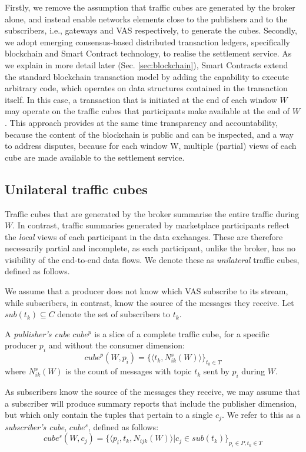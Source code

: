 \documentclass[conference]{IEEEtran}
\begin{document}
Firstly, we remove the assumption that traffic cubes are generated by the broker alone, and instead enable networks elements close to the publishers and to the subscribers, i.e., gateways and VAS respectively, to generate the cubes.
%
Secondly, we adopt emerging consensus-based distributed transaction ledgers, specifically blockchain and Smart Contract technology, to realise the settlement service.
As we explain in more detail later (Sec. \ref{sec:blockchain}), Smart Contracts extend the standard blockchain transaction model by adding the capability to execute arbitrary code, which operates on data structures contained in the transaction itself. 
In this case, a transaction that is initiated at the end of each window $W$ may operate on the traffic cubes that participants make available at the end of $W$.
This  approach provides at the same time transparency and accountability, because the content of the blockchain is public and can be inspected, and a way to address disputes, because for each window W, multiple (partial) views of each cube are made available to the settlement service.

\subsection{Unilateral traffic cubes} \label{sec:u-cubes}

Traffic cubes that are generated by the broker summarise the entire traffic during $W$.
In contrast, traffic summaries generated by marketplace participants reflect the \textit{local} views of each participant in the data exchanges.
These are therefore necessarily partial and incomplete, as each participant, unlike the broker, has no visibility of the end-to-end data flows. 
We denote these as \textit{unilateral} traffic cubes, defined as follows.

We assume that a producer does not know which VAS subscribe to its stream, while subscribers, in contrast, know the source of the messages they receive. 
Let $\mathit{sub}(t_k) \subseteq C $ denote the set of subscribers to $t_k$.

A \textit{publisher's cube} $\mathit{cube^p}$ is a slice of a complete traffic cube, for a specific producer $p_i$ and without the consumer dimension:
\[
\mathit{cube}^p(W, p_i)  =  \{ \langle t_k,  N^s_{ik}(W) \rangle \}_{t_k \in T}
\]
where $N^s_{ik}(W)$ is the count of messages with topic $t_k$ sent by $p_i$ during $W$.

As subscribers know the source of the messages they receive, we may assume that a subscriber will produce summary reports that include the publisher dimension, but which only contain the tuples that pertain to a single $c_j$. We refer to this as a \textit{subscriber's cube}, $ \mathit{cube^s} $, defined as follows:
\[
\mathit{cube^s}(W, c_j)  =  \{ \langle p_i, t_k, N_{ijk}(W) \rangle | c_j \in \mathit{sub}(t_k)\}_{p_i \in P, t_k \in T}
\]
\end{document}

